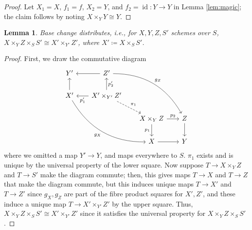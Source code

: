 \documentclass[10pt]{article}
\newtheorem{lemma}[subsubsection]{Lemma}
\theoremstyle{definition}
\theoremstyle{remark}
\numberwithin{equation}{section}
\numberwithin{figure}{subsubsection}
\DeclareMathOperator{\id}{id}
\begin{document}
\begin{proof}
  Let $X_1 = X$, $f_1 = f$, $X_2 = Y$, and $f_2 = \id \colon Y \to Y$ in Lemma
  \ref{lem:magic}; the claim follows by noting $X \times_Y Y \cong Y$.
\end{proof}
\begin{lemma}\label{basechangedist}
  Base change distributes, i.e., for $X,Y,Z,S'$ schemes over $S$, $X \times_Y Z \times_S S' \cong X' \times_{Y'} Z'$, where $X' \coloneqq X \times_S S'$.
\end{lemma}
\begin{proof}
  First, we draw the commutative diagram
  \begin{equation}\label{bcdistdiag}
    \begin{tikzcd}[column sep=scriptsize]
      Y' & \arrow{l} Z'\arrow[bend left]{ddrr}{g_Z}\\
      X'\arrow[bend right]{ddrr}[swap]{g_X}\uar & \arrow{l}{p_1'}X' \times_{Y'} Z'\uar[swap]{p_2'}\arrow[dashed]{dr}{\pi_1}\\
      && X \times_Y Z\dar[swap]{p_1} \rar{p_2} & Z\dar\\
      && X \rar & Y
    \end{tikzcd}
  \end{equation}
  where we omitted a map $Y' \to Y$, and maps everywhere to $S$. $\pi_1$ exists and is unique by the universal property of the lower square. Now suppose $T \to X \times_Y Z$ and $T \to S'$ make the diagram commute; then, this gives maps $T \to X$ and $T \to Z$ that make the diagram commute, but this induces unique maps $T \to X'$ and $T \to Z'$ since $g_X,g_Z$ are part of the fibre product squares for $X',Z'$, and these induce a unique map $T \to X' \times_{Y'} Z'$ by the upper square. Thus, $X \times_Y Z \times_S S' \cong X' \times_{Y'} Z'$ since it satisfies the universal property for $X \times_Y Z \times_S S'$.
\end{proof}
\end{document}
